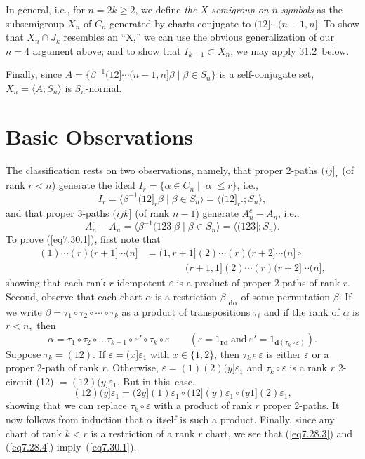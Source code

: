 \documentclass{surv-l}
\numberwithin{equation}{section}
\numberwithin{table}{section}
\numberwithin{figure}{section}
\theoremstyle{definition}
\begin{document}
In general, i.e., for $n =2k\geq 2$, we define \emph{the} $X$
\emph{semigroup on} $n$ \emph{symbols} as the
subsemigroup $X_{n}$ of $C_{n}$ generated by charts conjugate to
$(12]\cdots(n - 1, n]$. To show that $X_{n}\cap J_{k}$ resembles
an ``X,'' we can use the obvious generalization of our $n =4$
argument above; and to show that $I_{k-1}\subset X_{n}$, we may
apply 31.2~below.

Finally, since $A=\{\beta^{-1}(12]\cdots(n-1, n]\beta\mid
\beta\in S_{n}\}$ is a self-conjugate set, $X_{n}=\langle
A;S_{n}\rangle$ is $S_{n}$-normal.

\section{Basic Observations}\label{sec7.30}

The classification rests on two observations, namely, that proper
2-paths $(ij]_{r}$ (of rank $r<n$) generate the ideal
$I_{r}=\{\alpha\in C_{n}\mid |\alpha|\leq r\}$, i.e.,
\begin{equation}\label{eq7.30.1}
 I_{r}=\langle \beta^{-1}(12]_{r}\beta\mid \beta\in S_{n}\rangle=\langle(12]_{r}.;S_{n}\rangle,
\end{equation}
and that proper 3-paths $(ijk]$ (of rank $n -1$) generate
$A_{n}^{c}-A_{n}$, i.e.,
\begin{equation}\label{eq7.30.2}
  A_{n}^{c}-A_{n}=\langle\beta^{-1}(123]\beta\mid \beta\in S_{n}\rangle=\langle (123];S_{n}\rangle.
\end{equation}
To prove (\ref{eq7.30.1}), first note that
\begin{align*}
(1)\cdots (r)(r+1]\cdots(n]&=(1, r+1](2)\cdots(r)(r+2]\cdots(n]\circ \\
&\qquad\qquad (r+1,1](2)\cdots(r)(r+2]\cdots(n],
\end{align*}
showing that each rank $r$ idempotent $\varepsilon$ is a product
of proper 2-paths of rank $r$. Second, observe that each chart
$\alpha$ is a restriction $\beta|_{\mathbf{d}\alpha}$ of some
permutation $\beta$: If we write $\beta=\tau_{1}\circ
\tau_{2}\circ\cdots \circ \tau_{k}$ as a product of transpositions
$\tau_{i}$ and if the rank of $\alpha$ is $r<n$,~then
\[
\alpha=\tau_{1}\circ\tau_{2}\circ\ldots
\tau_{k-1}\circ\varepsilon'\circ\tau_{k}\circ\varepsilon\qquad
(\varepsilon=1_{\mathbf{r}\alpha}\ \mathrm{and}\
\varepsilon'=1_{\mathbf{d}(\tau_{k}\circ\varepsilon)}).
\]
Suppose $\tau_{k}=(12)$. If $\varepsilon=(x]\varepsilon_{1}$ with
$x\in\{1,2\}$, then $\tau_{k}\circ\varepsilon$ is either
$\varepsilon$ or a proper 2-path of rank $r$. Otherwise,
$\varepsilon =(1)(2)(y]\varepsilon_{1}$ and
$\tau_{k}\circ\varepsilon$ is a rank $r$ 2-circuit (12)
$=(12)(y]\varepsilon_{1}$. But in this~case,
\[
(12)(y]\varepsilon_{1}=(2y](1)\varepsilon_{1}\circ (12](y)\varepsilon_{1}\circ (y1](2)\varepsilon_{1},
\]
showing that we can replace $\tau_{k}\circ\varepsilon$ with a
product of rank $r$ proper 2-paths. It now follows from induction
that $\alpha$ itself is such a product. Finally, since any chart
of rank $k<r$ is a restriction of a rank $r$ chart, we see that
(\ref{eq7.28.3}) and (\ref{eq7.28.4}) imply~(\ref{eq7.30.1}).
\end{document}
